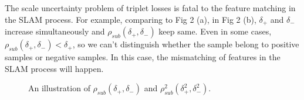 \documentclass[letterpaper, 10 pt, conference]{ieeeconf}  %
\begin{document}
The scale uncertainty problem of triplet losses is fatal to the feature matching in the SLAM process. For example, comparing to Fig 2 (a), in  Fig 2 (b), $\delta _{+}$ and $\delta _{-}$increase simultaneously and $\rho _{sub}\left ( \delta _{+} , \delta _{-} \right )$ keep same. Even  in some cases, $\rho _{sub}\left ( \delta _{+} , \delta _{-} \right ) < \delta _{+}$, so we can't distinguish whether the sample belong to positive samples or negative samples. In this case, the mismatching of features in the SLAM process will happen.

\begin{figure}[htbp]
\centering
{}%
%
\centering
\caption{ An illustration of   $\rho _{sub}\left ( \delta _{+} , \delta _{-} \right ) $ and $\rho _{sub}^{2}\left ( \delta _{+}^{2} , \delta _{-}^{2} \right ) $. }
\end{figure}
\end{document}
